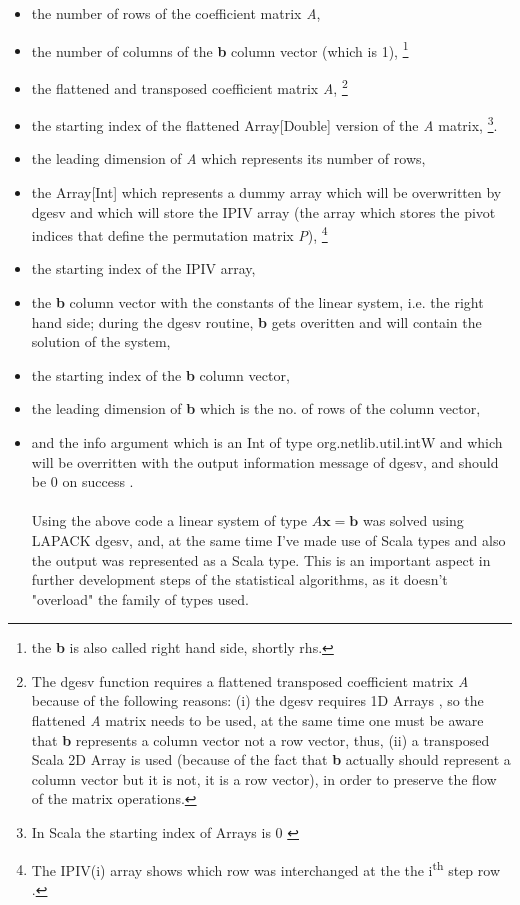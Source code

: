 \documentclass {article}
\begin{document}
\begin{itemize}
\item the number of rows of the coefficient matrix \textit{A}, 
\item the number of columns of the \textbf{b} column vector (which is 1), \footnote{the \textbf{b} is also called right hand side, shortly rhs.} 
\item the flattened and transposed coefficient matrix \textit{A}, \footnote{The dgesv function requires a flattened transposed coefficient matrix \textit{A} because of the following reasons: (i) the dgesv requires 1D Arrays \cite{doolin_jlapack_1999}, so the flattened \textit{A} matrix needs to be used, at the same time one must be aware that \textbf{b} represents a column vector not a row vector, thus, (ii) a transposed Scala 2D Array is used (because of the fact that \textbf{b} actually should represent a column vector but it is not, it is a row vector), in order to preserve the flow of the matrix operations.}   
\item the starting index of the flattened Array[Double] version of the \textit{A} matrix, \footnote{ In Scala the starting index of Arrays is 0 \cite{odersky_programming_2010} \cite{lewis_introduction_2017}}. 
\item the leading dimension of \textit{A} which represents its number of rows, 
\item the Array[Int] which represents a dummy array which will be overwritten by dgesv and which will store the IPIV array (the array which stores the pivot indices that define the permutation matrix \textit{P}), \footnote{The IPIV(i) array shows which row was interchanged at the the i\textsuperscript{th} step row \cite{nag_ltd._nag_nodate}.}  
\item the starting index of the IPIV array,
\item the \textbf{b} column vector with the constants of the linear system, i.e. the right hand side; during the dgesv routine, \textbf{b} gets overitten and will contain the solution of the system,
\item the starting index of the \textbf{b} column vector, 
\item the leading dimension of \textbf{b} which is the no. of rows of the column vector,
\item and the info argument which is an Int of type org.netlib.util.intW and which will be overritten with the output information message of dgesv, and should be 0 on success \cite{nag_ltd._nag_nodate}.
\\
\\
Using the above code a linear system of type $A\textbf{x}=\textbf{b}$ was solved using LAPACK dgesv, and, at the same time I've made use of Scala types and also the output was represented as a Scala type. This is an important aspect in further development steps of the statistical algorithms, as it doesn't "overload" the family of types used.  
 
\end{itemize}    
    
\end{document}
